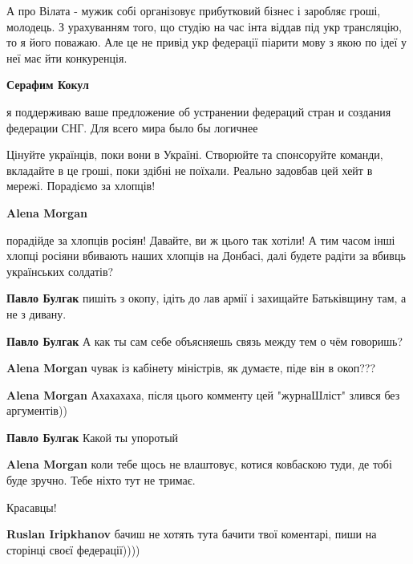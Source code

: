 \begin{itemize}
\begin{itemize}
\begin{itemize}
А про Вілата - мужик собі організовує прибутковий бізнес і заробляє гроші,
молодець. З урахуванням того, що студію на час інта віддав під укр трансляцію,
то я його поважаю. Але це не привід укр федерації піарити мову з якою по ідеї у
неї має йти конкуренція.

\textbf{Серафим Кокул} 

я поддерживаю ваше предложение об устранении федераций стран и создания
федерации СНГ. Для всего мира было бы логичнее

\end{itemize} %

\end{itemize} %


Цінуйте українців, поки вони в Україні. Створюйте та спонсоруйте команди,
вкладайте в це гроші, поки здібні не поїхали. Реально задовбав цей хейт в
мережі. Порадіємо за хлопців!

\begin{itemize} %
\textbf{Alena Morgan} 

порадійде за хлопців росіян! Давайте, ви ж цього так хотіли! А тим часом інші
хлопці росіяни вбивають наших хлопців на Донбасі, далі будете радіти за вбивць
українських солдатів?

\begin{itemize} %
\textbf{Павло Булгак} пишіть з окопу, ідіть до лав армії і захищайте Батьківщину там, а не з дивану.

\textbf{Павло Булгак} А как ты сам себе объясняешь связь между тем о чём говоришь?

\textbf{Alena Morgan} чувак із кабінету міністрів, як думаєте, піде він в окоп???

\textbf{Alena Morgan} Ахахахаха, після цього комменту цей "журнаШліст" злився без аргументів))

\textbf{Павло Булгак} Какой ты упоротый
\end{itemize} %

\textbf{Alena Morgan} коли тебе щось не влаштовує, котися ковбаскою туди, де тобі буде зручно. Тебе ніхто тут не тримає.
\end{itemize} %

Красавцы!

\textbf{Ruslan Iripkhanov} бачиш не хотять тута бачити твої коментарі, пиши на сторінці своєї федерації))))


\end{itemize}
